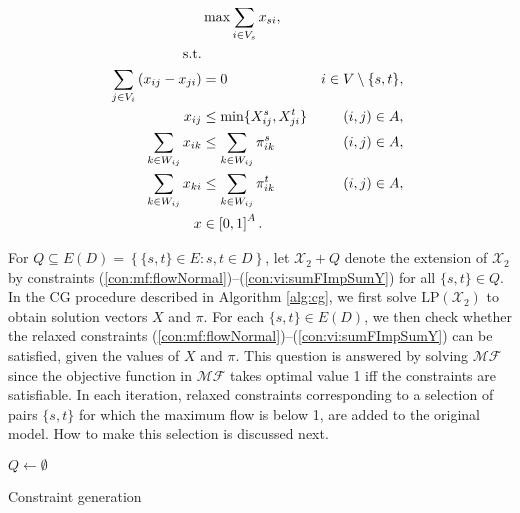 \begin{subequations}\label{eq:mf}
\begin{align}
\label{objective:maxf} &\max\sum\limits_{i \in V_s} x_{si}, \\ 
\text{s.t.}  \notag   \\
\label{con:maxf:flowNormal}  \sum\limits_{\substack{ j\in V_i}}\left(x_{ij}-x_{ji}\right) & = 0 & i\in V\setminus\{s,t\},\\
\label{con:maxf:fcapst}   x_{ij} &\leq \min\{X_{ij}^s, X_{ji}^t\}     &  (i,j)\in A,  \\ 	 
\label{con:maxf:sumFImpSumYst} \sum_{k\in W_{ij}}x_{ik} & \leq \sum_{k\in W_{ij}} \pi^{s}_{ik} & (i,j)\in A,\\
\label{con:maxf:sumFImpSumYts} \sum_{k\in W_{ij}}x_{ki} & \leq \sum_{k\in W_{ij}} \pi^{t}_{ik} & (i,j)\in A,\\
\label{con:maxf:fdim}x&\in\left[0,1\right]^{A}. 
\end{align}~
\end{subequations}  
  
For $Q\subseteq E(D)=\left\{\{s,t\}\in E: s,t\in D\right\}$, let $\mathcal{X}_2+Q$ denote the extension of $\mathcal{X}_2$ by constraints (\ref{con:mf:flowNormal})--(\ref{con:vi:sumFImpSumY}) for all $\{s,t\}\in Q$.
In the CG procedure described in Algorithm \ref{alg:cg},
we first solve $\text{LP}(\mathcal{X}_2)$ to obtain solution vectors $X$ and $\pi$.
For each $\{s,t\}\in E(D)$, we then check whether the relaxed constraints (\ref{con:mf:flowNormal})--(\ref{con:vi:sumFImpSumY}) can be satisfied,
given the values of $X$ and $\pi$.
This question is answered by solving $\mathcal{MF}$
since the objective function in $\mathcal{MF}$ takes optimal value 1 iff the constraints are satisfiable.
In each iteration,
relaxed constraints corresponding to a selection of pairs $\{s,t\}$ for which the maximum flow is below 1, are added to the original model.
How to make this selection is discussed next.

\begin{algorithm}
$Q\leftarrow\emptyset$\\
 \caption{Constraint generation}
\label{alg:cg}
\end{algorithm}

